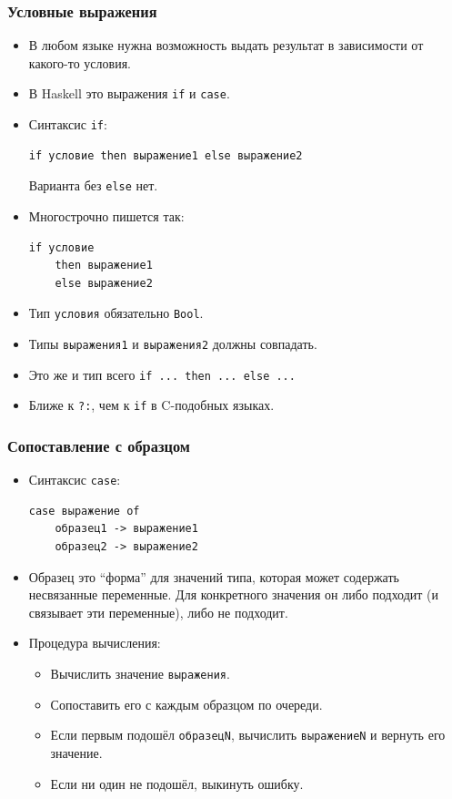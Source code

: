 \documentclass[11pt]{beamer}
\begin{document}
\begin{frame}[fragile]
\frametitle{Условные выражения}
\begin{itemize}
    \item В любом языке нужна возможность выдать результат в зависимости от какого-то условия.
    \item В Haskell это выражения \lstinline|if| и \lstinline|case|.
    \item Синтаксис \lstinline|if|: 
\begin{lstlisting}
if условие then выражение1 else выражение2
\end{lstlisting}    
    Варианта без \lstinline|else| нет.
    \item Многострочно пишется так:
\begin{lstlisting}
if условие 
    then выражение1 
    else выражение2
\end{lstlisting}    
    \item Тип \lstinline|условия| обязательно \lstinline|Bool|.
    \item Типы \lstinline|выражения1| и \lstinline|выражения2| должны совпадать. 
    \item Это же и тип всего  \lstinline|if ... then ... else ...|
\item Ближе к \lstinline|?:|, чем к \lstinline|if| в C-подобных языках.
\end{itemize}
\end{frame}

\begin{frame}[fragile]
\frametitle{Сопоставление с образцом}
\begin{itemize}
    \item Синтаксис \lstinline|case|: \\
\begin{lstlisting}
case выражение of 
    образец1 -> выражение1 
    образец2 -> выражение2
\end{lstlisting}
    \item Образец это \enquote{форма} для значений типа, которая может содержать несвязанные переменные. Для конкретного значения он либо подходит (и связывает эти переменные), либо не подходит.
    \item Процедура вычисления:
    \begin{itemize}
        \item Вычислить значение \lstinline|выражения|.
        \item Сопоставить его с каждым образцом по очереди. 
        \item Если первым подошёл \lstinline|образецN|, вычислить \lstinline|выражениеN| и вернуть его значение.
        \item Если ни один не подошёл, выкинуть ошибку.
    \end{itemize}
\end{itemize}
\end{frame}
\end{document}
